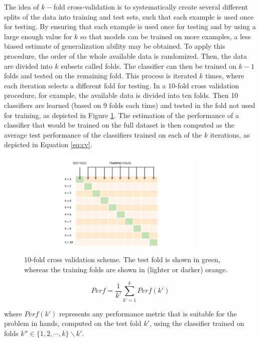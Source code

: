 The idea of $k-$fold cross-validation is to systematically create several different splits of the data into training and test sets, such that each example is used once for testing. By ensuring that each example is used once for testing and by using a large enough value for $k$ so that models can be trained on more examples, a less biased estimate of generalization ability may be obtained. To apply this procedure, the order of the whole available data is randomized. Then, the data are divided into $k$ subsets called folds. The classifier can then be trained on $k-1$ folds and tested on the remaining fold. This process is iterated $k$ times, where each iteration selects a different fold for testing. In a 10-fold cross validation procedure, for example, the available data is divided into ten folds. Then 10 classifiers are learned (based on 9 folds each time) and tested in the fold not used for training, as depicted in Figure \ref{fig:10fold}. The estimation of the performance of a classifier that would be trained on the full dataset is then computed as the average test performance of the classifiers trained on each of the $k$ iterations, as depicted in Equation \ref{eq:cv}. 

\begin{figure}[h]
    \centering
    \includegraphics[width=0.8\textwidth]{figures/10fold-1-1.pdf}
    \caption{10-fold cross validation scheme. The test fold is shown in green, whereas the training folds are shown in (lighter or darker) orange.}
    \label{fig:10fold}
\end{figure}

\begin{equation}
    Perf = \frac{1}{k'}\sum_{k' = 1}^{k} Perf(k')
    \label{eq:cv}
\end{equation}

\noindent where $Perf(k')$ represents any performance metric that is suitable for the problem in hands, computed on the test fold $k'$, using the classifier trained on folds $k'' \in \{1,2,\cdots,k\} \backslash k'$.




